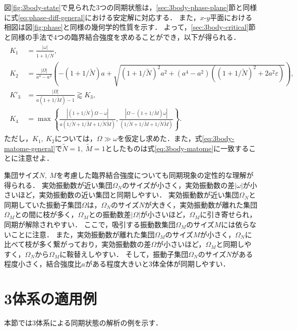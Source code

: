 \documentclass[../main]{subfiles}
\begin{document}
図\ref{fig:3body-state}で見られた3つの同期状態は，\ref{sec:3body-phase-plane}節と同様に式\eqref{eq:phase-diff-general}における安定解に対応する．
また，$x$-$y$平面における相図は図\ref{fig:phase}と同様の幾何学的性質を示す．
よって，\ref{sec:3body-critical}節と同様の手法で4つの臨界結合強度を求めることができ，以下が得られる．
\begin{align}
    \label{eq:3body-matome-general}
    \begin{split}
        K_1&=\frac{|\omega|}{1+1/\tilde{N}},\\
        K_2&=\frac{|\Omega|}{a^4-a^2}\left(-\left( 1+1/\tilde{N} \right)a+\sqrt{\left( 1+1/\tilde{N} \right)^2a^2+(a^4-a^2)\left(\left( 1+1/\tilde{N} \right)^2+2a^2\varepsilon\right)}\right),\\
        K'_3&=\frac{|\Omega|}{a(1+1/\tilde{M})-1}\gtrapprox K_3,\\
        K_4&=\max\left\{\frac{|(1+1/\tilde{N})\Omega-\omega|}{a(1/\tilde{N}+1/\tilde{M}+1/\tilde{N}\tilde{M})},\frac{|\Omega-(1+1/\tilde{M})\omega|}{(1/\tilde{N}+1/\tilde{M}+1/\tilde{N}\tilde{M})}\right\}.
    \end{split}
\end{align}
ただし，$K_1,\ K_2$については，$\Omega\gg\omega$を仮定し求めた．また，式\eqref{eq:3body-matome-general}で$\tilde{N}=1,\ \tilde{M}=1$としたものは式\eqref{eq:3body-matome}に一致することに注意せよ．

集団サイズ$N,\ M$を考慮した臨界結合強度についても同期現象の定性的な理解が得られる．
実効振動数が近い集団$\Omega_N$のサイズが小さく，実効振動数の差$|\omega|$が小さいほど，実効振動数の近い集団と同期しやすい．
実効振動数が近い集団$\Omega_N$と同期していた振動子集団$\Omega$は，$\Omega_N$のサイズ$N$が大きく，実効振動数が離れた集団$\Omega_M$との間に枝が多く，$\Omega_M$との振動数差$|\Omega|$が小さいほど，$\Omega_M$に引き寄せられ，同期が解除されやすい．
ここで，吸引する振動数集団$\Omega_M$のサイズ$M$には依らないことに注意．
また，実効振動数が離れた集団$\Omega_M$のサイズ$M$が小さく，$\Omega_N$に比べて枝が多く繋がっており，実効振動数の差$\Omega$が小さいほど，$\Omega_M$と同期しやすく，$\Omega_N$から$\Omega_M$に鞍替えしやすい．
そして，振動子集団$\Omega_N$のサイズ$N$がある程度小さく，結合強度比$a$がある程度大きいと3体全体が同期しやすい．

\section{3体系の適用例}
本節では3体系による同期状態の解析の例を示す．
\end{document}
